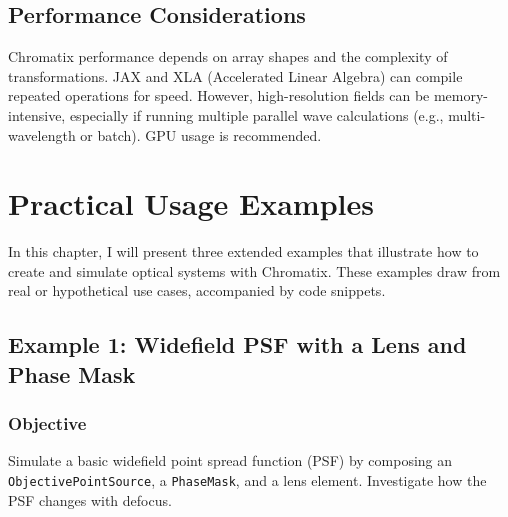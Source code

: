 \documentclass[a4paper,12pt]{report}
\begin{document}
\section{Performance Considerations}
Chromatix performance depends on array shapes and the complexity of transformations. JAX and XLA (Accelerated Linear Algebra) can compile repeated operations for speed. However, high-resolution fields can be memory-intensive, especially if running multiple parallel wave calculations (e.g., multi-wavelength or batch). GPU usage is recommended.

\chapter{Practical Usage Examples}
In this chapter, I will present three extended examples that illustrate how to create and simulate optical systems with Chromatix. These examples draw from real or hypothetical use cases, accompanied by code snippets.

\section{Example 1: Widefield PSF with a Lens and Phase Mask}
\subsection{Objective}
Simulate a basic widefield point spread function (PSF) by composing an \texttt{ObjectivePointSource}, a \texttt{PhaseMask}, and a lens element. Investigate how the PSF changes with defocus.
\end{document}
